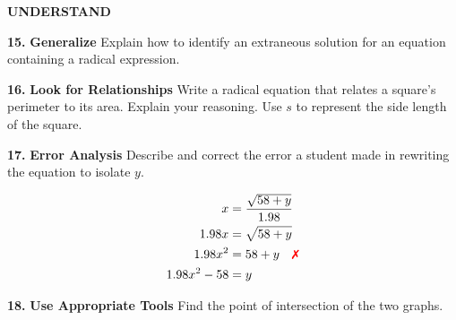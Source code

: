 \documentclass{article}
\newenvironment{practice}[2]{\noindent\textbf{#1.}}{}
\begin{document}
\begin{minipage}[t]{0.45\textwidth}
\textbf{\large UNDERSTAND}

\begin{practice}{15}{}
\textbf{Generalize} Explain how to identify an extraneous solution for an equation containing a radical expression.
\end{practice}

\begin{practice}{16}{}
\textbf{Look for Relationships} Write a radical equation that relates a square's perimeter to its area. Explain your reasoning. Use $s$ to represent the side length of the square.
\end{practice}

\begin{practice}{17}{}
\textbf{Error Analysis} Describe and correct the error a student made in rewriting the equation to isolate $y$.

\begin{center}
\colorbox{gray!10}{\parbox{4cm}{
\begin{align*}
x &= \frac{\sqrt{58 + y}}{1.98} \\
1.98x &= \sqrt{58 + y} \\
1.98x^2 &= 58 + y \quad \text{\textcolor{red}{\ding{55}}} \\
1.98x^2 - 58 &= y
\end{align*}
}}
\end{center}
\end{practice}

\begin{practice}{18}{}
\textbf{Use Appropriate Tools} Find the point of intersection of the two graphs.

\begin{center}
\end{center}
\end{practice}


\end{minipage}
\end{document}
